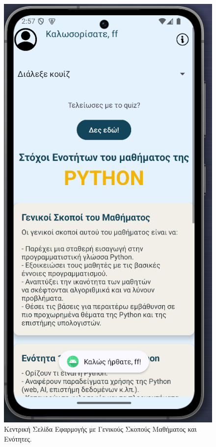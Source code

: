 \documentclass[11pt]{report}
\begin{document}
\begin{figure}[H]
  \centering
  \includegraphics[width=0.9\linewidth, height=0.35\textheight, keepaspectratio]{Figures/s3.png}
  \caption{Κεντρική Σελίδα Εφαρμογής με Γενικούς Σκοπούς Μαθήματος και Ενότητες.}
\end{figure}
\end{document}
